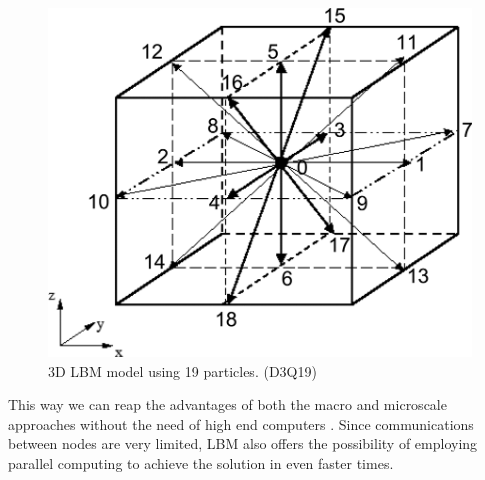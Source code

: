 \documentclass[12pt, openany]{book}
\begin{document}
\begin{figure}[H]
\centering
  \includegraphics[width=0.3\linewidth]{Resources/Images/d3q19.png}
  \caption{3D LBM model using 19 particles. (D3Q19)}
  \label{fig:d3q19}
\end{figure}

\par
This way we can reap the advantages of both the macro and microscale approaches without the need of high end computers \cite{lbm_springer}. Since communications between nodes are very limited, LBM also offers the possibility of employing parallel computing to achieve the solution in even faster times.
\end{document}
